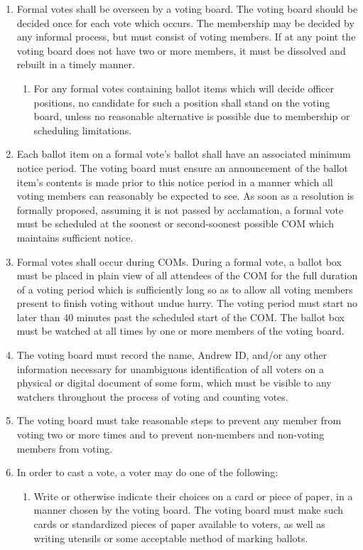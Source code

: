 \documentclass[11pt]{article}
\newcounter{h1}
\newcounter{h2}[h1]
\newcounter{h3}[h2]
\begin{document}
\begin{enumerate}
  \item Formal votes shall be overseen by a voting board. The voting board should be decided once for each vote which occurs. The membership may be decided by any informal process, but must consist of voting members. If at any point the voting board does not have two or more members, it must be dissolved and rebuilt in a timely manner.
  \begin{enumerate}
    \item For any formal votes containing ballot items which will decide officer positions, no candidate for such a position shall stand on the voting board, unless no reasonable alternative is possible due to membership or scheduling limitations.
  \end{enumerate}
  \item Each ballot item on a formal vote's ballot shall have an associated minimum notice period. The voting board must ensure an announcement of the ballot item's contents is made prior to this notice period in a manner which all voting members can reasonably be expected to see. As soon as a resolution is formally proposed, assuming it is not passed by acclamation, a formal vote must be scheduled at the soonest or second-soonest possible COM which maintains sufficient notice.
  \item Formal votes shall occur during COMs. During a formal vote, a ballot box must be placed in plain view of all attendees of the COM for the full duration of a voting period which is sufficiently long so as to allow all voting members present to finish voting without undue hurry. The voting period must start no later than 40 minutes past the scheduled start of the COM. The ballot box must be watched at all times by one or more members of the voting board.
  \item The voting board must record the name, Andrew ID, and/or any other information necessary for unambiguous identification of all voters on a physical or digital document of some form, which must be visible to any watchers throughout the process of voting and counting votes.
  \item The voting board must take reasonable steps to prevent any member from voting two or more times and to prevent non-members and non-voting members from voting.
  \item In order to cast a vote, a voter may do one of the following:
  \begin{enumerate}
    \item Write or otherwise indicate their choices on a card or piece of paper, in a manner chosen by the voting board. The voting board must make such cards or standardized pieces of paper available to voters, as well as writing utensils or some acceptable method of marking ballots.

\end{enumerate}
\end{enumerate}
\end{document}

